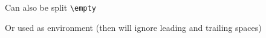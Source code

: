 \documentclass{article}
\begin{document}

\usestorebox{\mybox}
\usestorebox{\mybox}

\storebox\mybox\bgroup
Can also be split
\verb+\empty+
\egroup

\usestorebox{\mybox}
\usestorebox{\mybox}

\begin{storebox}{\mybox}
 Or used as environment
 (then will ignore leading and trailing spaces)
\end{storebox}

\usestorebox{\mybox}
\usestorebox{\mybox}
\end{document}
